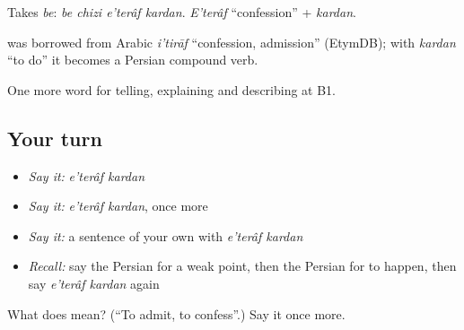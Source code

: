 Takes \emph{be}: \emph{be chizi e'terâf kardan}. \emph{E'terâf} \textquotedblleft{}confession\textquotedblright{} + \emph{kardan}.

\begin{cousinweb}
\textbf{} was borrowed from Arabic \emph{i'tirāf} \textquotedblleft{}confession, admission\textquotedblright{} (EtymDB); with \emph{kardan} \textquotedblleft{}to do\textquotedblright{} it becomes a Persian compound verb.
\end{cousinweb}

\begin{grammarlens}[title={What you've built}]
One more word for telling, explaining and describing at B1.
\end{grammarlens}

\subsection*{Your turn}
\begin{itemize}
\raggedright
  \item \emph{Say it:} \emph{e'terâf kardan}
  \item \emph{Say it:} \emph{e'terâf kardan}, once more
  \item \emph{Say it:} a sentence of your own with \emph{e'terâf kardan}
  \item \emph{Recall:} say the Persian for a weak point, then the Persian for to happen, then say \emph{e'terâf kardan} again
\end{itemize}

\begin{tcolorbox}[breakable,colback=teal!4,colframe=teal!35!black,title={Before you move on}]
What does   mean? (\textquotedblleft{}To admit, to confess\textquotedblright{}.) Say it once more.
\end{tcolorbox}
